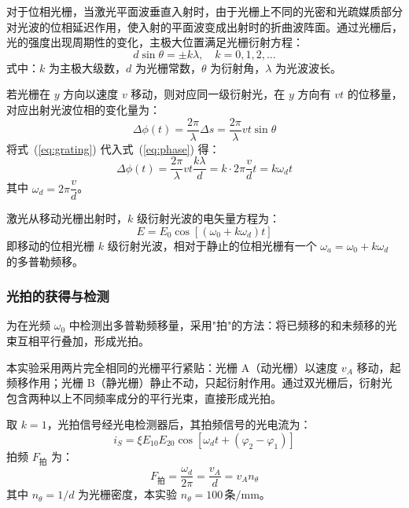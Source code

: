 \documentclass[dvipsnames, svgnames,a4paper,11pt]{article}
\begin{document}
对于位相光栅，当激光平面波垂直入射时，由于光栅上不同的光密和光疏媒质部分对光波的位相延迟作用，使入射的平面波变成出射时的折曲波阵面。通过光栅后，光的强度出现周期性的变化，主极大位置满足光栅衍射方程：
\begin{equation}
    d\sin\theta = \pm k\lambda, \quad k = 0, 1, 2, \ldots
    \label{eq:grating}
\end{equation}
式中：$k$ 为主极大级数，$d$ 为光栅常数，$\theta$ 为衍射角，$\lambda$ 为光波波长。

若光栅在 $y$ 方向以速度 $v$ 移动，则对应同一级衍射光，在 $y$ 方向有 $vt$ 的位移量，对应出射光波位相的变化量为：
\begin{equation}
    \Delta\phi(t) = \frac{2\pi}{\lambda}\Delta s = \frac{2\pi}{\lambda}vt\sin\theta
    \label{eq:phase}
\end{equation}
将式~(\ref{eq:grating}) 代入式~(\ref{eq:phase}) 得：
\begin{equation}
    \Delta\phi(t) = \frac{2\pi}{\lambda}vt\frac{k\lambda}{d} = k\cdot 2\pi\frac{v}{d}t = k\omega_d t
    \label{eq:doppler_phase}
\end{equation}
其中 $\omega_d = 2\pi\dfrac{v}{d}$。

激光从移动光栅出射时，$k$ 级衍射光波的电矢量方程为：
\begin{equation}
    E = E_0\cos[(\omega_0 + k\omega_d)t]
    \label{eq:efield}
\end{equation}
即移动的位相光栅 $k$ 级衍射光波，相对于静止的位相光栅有一个 $\omega_a = \omega_0 + k\omega_d$ 的多普勒频移。

\subsubsection{光拍的获得与检测}

为在光频 $\omega_0$ 中检测出多普勒频移量，采用"拍"的方法：将已频移的和未频移的光束互相平行叠加，形成光拍。

本实验采用两片完全相同的光栅平行紧贴：光栅 A（动光栅）以速度 $v_A$ 移动，起频移作用；光栅 B（静光栅）静止不动，只起衍射作用。通过双光栅后，衍射光包含两种以上不同频率成分的平行光束，直接形成光拍。

取 $k=1$，光拍信号经光电检测器后，其拍频信号的光电流为：
\begin{equation}
    i_S = \xi E_{10}E_{20}\cos[\omega_d t + (\varphi_2 - \varphi_1)]
    \label{eq:photocurrent}
\end{equation}
拍频 $F_\text{拍}$ 为：
\begin{equation}
    F_\text{拍} = \frac{\omega_d}{2\pi} = \frac{v_A}{d} = v_A n_\theta
    \label{eq:beat_freq}
\end{equation}
其中 $n_\theta = 1/d$ 为光栅密度，本实验 $n_\theta = 100\,\text{条}/\text{mm}$。
\end{document}

